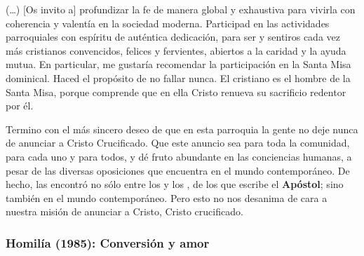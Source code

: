 \begin{body}
(\ldots) [Os invito a] profundizar la fe de manera global y exhaustiva para vivirla con coherencia y valentía en la sociedad moderna. Participad en las actividades parroquiales con espíritu de auténtica dedicación, para ser y sentiros cada vez más cristianos convencidos, felices y fervientes, abiertos a la caridad y la ayuda mutua. En particular, me gustaría recomendar la participación en la Santa Misa dominical. Haced el propósito de no fallar nunca. El cristiano es el hombre de la Santa Misa, porque comprende que en ella Cristo renueva su sacrificio redentor por él.

Termino con el más sincero deseo de que en esta parroquia la gente no deje nunca de anunciar a Cristo Crucificado. Que este anuncio sea para toda la comunidad, para cada uno y para todos,  y dé fruto abundante en las conciencias humanas, a pesar de las diversas oposiciones que encuentra en el mundo contemporáneo. De hecho, las encontró no sólo entre los  y los , de los que escribe el \textbf{Apóstol}; sino también en el mundo contemporáneo. Pero esto no nos desanima de cara a nuestra misión de anunciar a Cristo, Cristo crucificado.
\end{body}

\newpage
\subsubsection{Homilía (1985): Conversión y amor}


